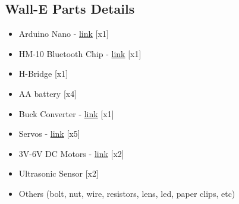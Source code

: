 \documentclass[12pt]{article}
\begin{document}
\subsection{Wall-E Parts Details}
\begin{itemize}
    \item Arduino Nano - \href{https://www.amazon.com/Arduino-A000005-ARDUINO-Nano/dp/B0097AU5OU/ref=asc_df_B0097AU5OU/?tag=hyprod-20&linkCode=df0&hvadid=241907595991&hvpos=&hvnetw=g&hvrand=1030222966127056408&hvpone=&hvptwo=&hvqmt=&hvdev=c&hvdvcmdl=&hvlocint=&hvlocphy=9060222&hvtargid=pla-559564017483&psc=1&mcid=070a72770c7e334fa02abb503757b8a1&gclid=Cj0KCQiA84CvBhCaARIsAMkAvkIJoyGS0PcNJItudCSnEclnk1MBDUQ7vMJqO9LYnJ1i24tnsd1vVvsaAh1QEALw_wcB}{link} [x1]
    \item HM-10 Bluetooth Chip - \href{https://www.amazon.com/DSD-TECH-Bluetooth-iBeacon-Arduino/dp/B06WGZB2N4?crid=2864IU5C7C4LI&keywords=hm-10+bluetooth+module&qid=1680999661&sprefix=hm-10+b,aps,211&sr=8-1-spons&psc=1&spLa=ZW5jcnlwdGVkUXVhbGlmaWVyPUFFMVI0RzdINktUR0omZW5jcnlwdGVkSWQ9QTA3MTEwNTQxWkNYRFhJWEdJSlBSJmVuY3J5cHRlZEFkSWQ9QTA2OTcyODkzMzdSV0FSMkhKRkdLJndpZGdldE5hbWU9c3BfYXRmJmFjdGlvbj1jbGlja1JlZGlyZWN0JmRvTm90TG9nQ2xpY2s9dHJ1ZQ%3D%3D&linkCode=sl1&tag=professorboot-20&linkId=51ea8e01ed875db9c550dfc3b298172f&language=en_US&ref_=as_li_ss_tl}{link} [x1]
    \item H-Bridge [x1]
    \item AA battery [x4]
    \item Buck Converter - \href{https://www.amazon.com/gp/product/B08Y674Z6F?ie=UTF8&th=1&linkCode=sl1&tag=professorboot-20&linkId=9f7b55a9e0472ae92cea90d04bb54435&language=en_US&ref_=as_li_ss_tl}{link} [x1]
    \item Servos - \href{https://www.amazon.com/dp/B098FG3LJF?th=1&linkCode=sl1&tag=professorboot-20&linkId=9cd9bc0acb06cb36fc01f502b2cd1ff1&language=en_US&ref_=as_li_ss_tl}{link} [x5]
    \item 3V-6V DC Motors - \href{https://www.amazon.com/dp/B09WMJJ8SF?psc=1&linkCode=sl1&tag=professorboot-20&linkId=741cfbc8d0840160116efdb36d687af6&language=en_US&ref_=as_li_ss_tl}{link} [x2]
    \item Ultrasonic Sensor [x2]
    \item Others (bolt, nut, wire, resistors, lens, led, paper clips, etc)
\end{itemize}
\end{document}
